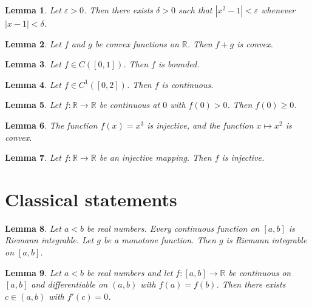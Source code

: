 \documentclass{article}
\newtheorem{lemma}{Lemma}
\begin{document}
\begin{lemma}\label{whenever}
Let $\varepsilon>0$. Then there exists $\delta>0$ such that $|x^2-1|<\varepsilon$ whenever $|x-1|<\delta$.
\end{lemma}

\begin{lemma}\label{plural-functions-on}
Let $f$ and $g$ be convex functions on $\mathbb{R}$. Then $f+g$ is convex.
\end{lemma}

\begin{lemma}\label{function-space}
Let $f\in C([0,1])$. Then $f$ is bounded.
\end{lemma}

\begin{lemma}\label{function-space-one}
Let $f\in C^1([0,2])$. Then $f$ is continuous.
\end{lemma}

\begin{lemma}\label{continuous-at}
Let $f\colon\mathbb{R}\to\mathbb{R}$ be continuous at $0$ with $f(0)>0$. Then $f(0)\ge0$.
\end{lemma}

\begin{lemma}\label{the-function}
The function $f(x)=x^3$ is injective, and the function $x\mapsto x^2$ is convex.
\end{lemma}

\begin{lemma}\label{injective-mapping}
Let $f\colon\mathbb{R}\to\mathbb{R}$ be an injective mapping. Then $f$ is injective.
\end{lemma}

\section{Classical statements}

\begin{lemma}\label{riemann}
Let $a<b$ be real numbers. Every continuous function on $[a,b]$ is Riemann integrable. Let $g$ be a monotone function. Then $g$ is Riemann integrable on $[a,b]$.
\end{lemma}

\begin{lemma}\label{rolle}
Let $a<b$ be real numbers and let $f\colon[a,b]\to\mathbb{R}$ be continuous on $[a,b]$ and differentiable on $(a,b)$ with $f(a)=f(b)$. Then there exists $c\in(a,b)$ with $f'(c)=0$.
\end{lemma}
\end{document}
